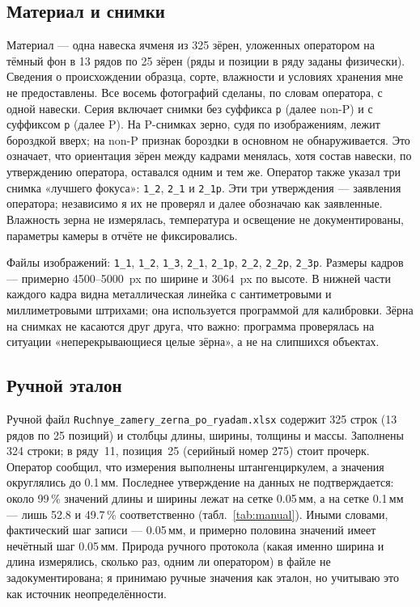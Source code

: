 \documentclass[12pt,a4paper]{article}
\begin{document}
\subsection{Материал и снимки}

Материал — одна навеска ячменя из 325 зёрен, уложенных оператором на
тёмный фон в 13 рядов по 25 зёрен (ряды и позиции в ряду заданы
физически). Сведения о происхождении образца, сорте, влажности и условиях
хранения мне не предоставлены. Все восемь фотографий сделаны, по
словам оператора, с одной навески. Серия включает снимки без суффикса
\texttt{p} (далее non-P) и с суффиксом \texttt{p} (далее P). На
P-снимках зерно, судя по изображениям, лежит бороздкой вверх; на
non-P признак бороздки в основном не обнаруживается. Это означает, что
ориентация зёрен между кадрами менялась, хотя состав навески, по
утверждению оператора, оставался одним и тем же. Оператор также указал три снимка «лучшего фокуса»: \texttt{1\_2},
\texttt{2\_1} и \texttt{2\_1p}. Эти три утверждения — заявления
оператора; независимо я их не проверял и далее обозначаю как заявленные.
Влажность зерна не измерялась, температура и освещение не
документированы, параметры камеры в отчёте не фиксировались.

Файлы изображений: \texttt{1\_1}, \texttt{1\_2}, \texttt{1\_3},
\texttt{2\_1}, \texttt{2\_1p}, \texttt{2\_2}, \texttt{2\_2p},
\texttt{2\_3p}. Размеры кадров — примерно \num{4500}--\num{5000}~px по
ширине и \num{3064}~px по высоте. В нижней части каждого кадра видна
металлическая линейка с сантиметровыми и миллиметровыми штрихами; она
используется программой для калибровки. Зёрна на снимках не касаются
друг друга, что важно: программа проверялась на ситуации
«неперекрывающиеся целые зёрна», а не на слипшихся объектах.

\subsection{Ручной эталон}

Ручной файл \texttt{Ruchnye\_zamery\_zerna\_po\_ryadam.xlsx} содержит
325 строк (13 рядов по 25 позиций) и столбцы длины, ширины, толщины и
массы. Заполнены 324 строки; в ряду~11, позиция~25 (серийный номер 275)
стоит прочерк. Оператор сообщил, что измерения выполнены
штангенциркулем, а значения округлялись до \num{0.1}\,мм. Последнее
утверждение на данных не подтверждается: около \num{99}\,\% значений
длины и ширины лежат на сетке \num{0.05}\,мм, а на сетке \num{0.1}\,мм —
лишь \num{52.8} и \num{49.7}\,\% соответственно (табл.~\ref{tab:manual}).
Иными словами, фактический шаг записи — \num{0.05}\,мм, и примерно
половина значений имеет нечётный шаг \num{0.05}\,мм. Природа ручного
протокола (какая именно ширина и длина измерялись, сколько раз, одним ли
оператором) в файле не задокументирована; я принимаю ручные значения как
эталон, но учитываю это как источник неопределённости.
\end{document}
